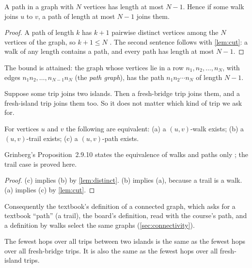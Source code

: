 \begin{corollary}\label{cor:bound}
A path in a graph with $N$ vertices has length at most $N-1$. Hence if
some walk joins $u$ to $v$, a path of length at most $N-1$ joins them.
\end{corollary}
\begin{proof}
A path of length $k$ has $k+1$ pairwise distinct vertices among the $N$
vertices of the graph, so $k+1\le N$ \cite[Section~2.9.4,
p.~40]{grinberg2025graph}. The second sentence follows with
\cref{lem:cut}: a walk of any length contains a path, and every path has
length at most $N-1$.
\end{proof}
The bound is attained: the graph whose vertices lie in a row $n_1,n_2,\dots,n_N$, with edges
$n_1n_2,\dots,n_{N-1}n_N$ (the \emph{path graph}), has the path
$n_1n_2\cdots n_N$ of length $N-1$.

\plainwords{} Suppose some trip joins two islands. Then a fresh-bridge trip
joins them, and a fresh-island trip joins them too. So it does not matter
which kind of trip we ask for.

\begin{proposition}\label{prop:together}
For vertices $u$ and $v$ the following are equivalent: (a) a $(u,v)$-walk
exists; (b) a $(u,v)$-trail exists; (c) a $(u,v)$-path exists.
\end{proposition}
Grinberg's Proposition~2.9.10 states the equivalence of walks and paths
only \cite[p.~42]{grinberg2025graph}; the trail case is proved here.
\begin{proof}
(c) implies (b) by \cref{lem:distinct}. (b) implies (a), because a trail
is a walk. (a) implies (c) by \cref{lem:cut}.
\end{proof}
Consequently the textbook's definition of a connected graph, which asks
for a textbook ``path'' (a trail), the board's definition, read with the
course's path, and a definition by walks select the same graphs
(\cref{sec:connectivity}).

\plainwords{} The fewest hops over all trips between two islands is the
same as the fewest hops over all fresh-bridge trips. It is also the same as
the fewest hops over all fresh-island trips.

